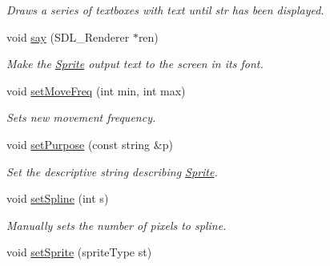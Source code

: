 \begin{DoxyCompactItemize}
\begin{DoxyCompactList}\small\item\em Draws a series of textboxes with text until str has been displayed. \end{DoxyCompactList}\item 
void \hyperlink{class_sprite_a14a138e5acf82b97c052673dffb744f6}{say} (S\+D\+L\+\_\+\+Renderer $\ast$ren)\hypertarget{class_sprite_a14a138e5acf82b97c052673dffb744f6}{}\label{class_sprite_a14a138e5acf82b97c052673dffb744f6}

\begin{DoxyCompactList}\small\item\em Make the \hyperlink{class_sprite}{Sprite} output text to the screen in its font. \end{DoxyCompactList}\item 
void \hyperlink{class_sprite_add3d25cc26178af6a14c45ac958422f2}{set\+Move\+Freq} (int min, int max)\hypertarget{class_sprite_add3d25cc26178af6a14c45ac958422f2}{}\label{class_sprite_add3d25cc26178af6a14c45ac958422f2}

\begin{DoxyCompactList}\small\item\em Sets new movement frequency. \end{DoxyCompactList}\item 
void \hyperlink{class_sprite_ac5cdeb3206d89719fc10af1146ebbaf6}{set\+Purpose} (const string \&p)\hypertarget{class_sprite_ac5cdeb3206d89719fc10af1146ebbaf6}{}\label{class_sprite_ac5cdeb3206d89719fc10af1146ebbaf6}

\begin{DoxyCompactList}\small\item\em Set the descriptive string describing \hyperlink{class_sprite}{Sprite}. \end{DoxyCompactList}\item 
void \hyperlink{class_sprite_a1ce4def2f83442fd086e38568f93c6cd}{set\+Spline} (int s)\hypertarget{class_sprite_a1ce4def2f83442fd086e38568f93c6cd}{}\label{class_sprite_a1ce4def2f83442fd086e38568f93c6cd}

\begin{DoxyCompactList}\small\item\em Manually sets the number of pixels to spline. \end{DoxyCompactList}\item 
void \hyperlink{class_sprite_aa9d0dd6123988d79c94a18f3e404d8d7}{set\+Sprite} (sprite\+Type st)\hypertarget{class_sprite_aa9d0dd6123988d79c94a18f3e404d8d7}{}\label{class_sprite_aa9d0dd6123988d79c94a18f3e404d8d7}


\end{DoxyCompactItemize}
